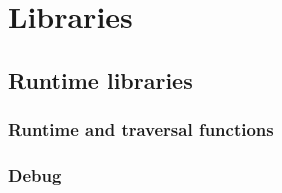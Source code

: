 \part{Libraries} 
\chapter{Runtime libraries}
\section{Runtime and traversal functions}

\section{Debug}
